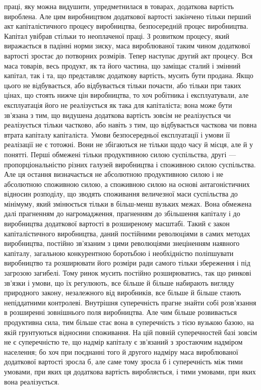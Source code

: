 \parcont{}  %
праці, яку можна видушити, упредметнилася в товарах, додаткова
вартість вироблена. Але цим виробництвом додаткової
вартості закінчено тільки перший акт капіталістичного процесу
виробництва, безпосередній процес виробництва. Капітал увібрав
стільки то неоплаченої праці. З розвитком процесу, який виражається
в падінні норми зиску, маса вироблюваної таким чином
додаткової вартості зростає до потворних розмірів. Тепер
наступає другий акт процесу. Вся маса товарів, весь продукт,
як та його частина, що заміщає сталий і змінний капітал, так
і та, що представляє додаткову вартість, мусить бути продана.
Якщо цього не відбувається, або відбувається тільки почасти,
або тільки при таких цінах, що стоять нижче цін виробництва,
то хоч робітника і експлуатували, але експлуатація його не
реалізується як така для капіталіста; вона може бути зв’язана
з тим, що видушена додаткова вартість зовсім не реалізується чи
реалізується тільки частково, або навіть з тим, що відбувається
часткова чи повна втрата капіталу капіталіста. Умови безпосередньої
експлуатації і умови її реалізації не є тотожні. Вони не
збігаються не тільки щодо часу й місця, але й у понятті. Перші
обмежені тільки продуктивною силою суспільства, другі — пропорціональністю
різних галузей виробництва і споживною силою
суспільства. Але ця остання визначається не абсолютною продуктивною
силою і не абсолютною споживною силою, а споживною
силою на основі антагоністичних відносин розподілу,
що зводять споживання величезної маси суспільства до мінімуму,
який змінюється тільки в більш-менш вузьких межах.
Вона обмежена далі прагненням до нагромадження, прагненням
до збільшення капіталу і до виробництва додаткової вартості
в розширеному масштабі. Такий є закон капіталістичного виробництва,
даний постійними революціями в самих методах виробництва,
постійно зв’язаним з цими революціями знеціненням
наявного капіталу, загальною конкурентною боротьбою і необхідністю
поліпшувати виробництво та розширювати його розміри
ради самого тільки збереження і під загрозою загибелі. Тому ринок
мусить постійно розширюватись, так що ринкові зв’язки і
умови, що їх регулюють, все більше й більше набирають
вигляду природного закону, незалежного від виробників, все
більше й більше стають непіддатними контролеві. Внутрішня
суперечність прагне знайти собі розв’язання в розширенні зовнішнього
поля виробництва. Але чим більше розвивається продуктивна
сила, тим більше стає вона в суперечність з тією
вузькою базою, на якій грунтуються відносини споживання. На
цій повній суперечностей базі зовсім не є суперечністю те,
що надмір капіталу є зв’язаний з зростаючим надміром населення;
бо хоч при поєднанні того й другого надміру маса вироблюваної
додаткової вартості зросла б, але саме тому зросла б
і суперечність між тими умовами, при яких ця додаткова вартість
виробляється, і тими умовами, при яких вона реалізується.
